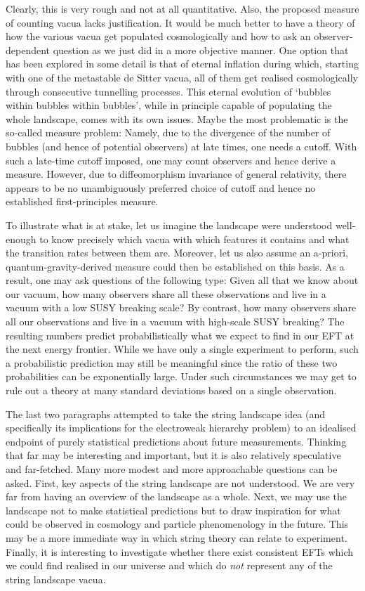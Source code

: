\documentclass[12pt]{article}
\numberwithin{equation}{section}
\begin{document}
Clearly, this is very rough and not at all quantitative. Also, the proposed measure of counting vacua lacks justification. It would be much better to have a theory of how the various vacua get populated cosmologically and how to ask an observer-dependent question as we just did in a more objective manner. One option that has been explored in some detail is that of eternal inflation during which, starting with one of the metastable de Sitter vacua, all of them get realised cosmologically through consecutive tunnelling processes. This eternal evolution of `bubbles within bubbles within bubbles', while in principle capable of populating the whole landscape, comes with its own issues. Maybe the most problematic is the so-called measure problem: Namely, due to the divergence of the number of bubbles (and hence of potential observers) at late times, one needs a cutoff. With such a late-time cutoff imposed, one may count observers and hence derive a measure. However, due to diffeomorphism invariance of general relativity, there appears to be no unambiguously preferred choice of cutoff and hence no established first-principles measure.

To illustrate what is at stake, let us imagine the landscape were understood well-enough to know precisely which vacua with which features it contains and what the transition rates between them are. Moreover, let us also assume an a-priori, quantum-gravity-derived measure could then be established on this basis. As a result, one may ask questions of the following type: Given all that we know about our vacuum, how many observers share all these observations and live in a vacuum with a low SUSY breaking scale? By contrast, how many observers share all our observations and live in a vacuum with high-scale SUSY breaking? The resulting numbers predict probabilistically what we expect to find in our EFT at the next energy frontier. While we have only a single experiment to perform, such a probabilistic prediction may still be meaningful since the ratio of these two probabilities can be exponentially large. Under such circumstances we may get to rule out a theory at many standard deviations based on a single observation.

The last two paragraphs attempted to take the string landscape idea (and specifically its implications for the electroweak hierarchy problem) to an idealised endpoint of purely statistical predictions about future measurements. Thinking that far may be interesting and important, but it is also relatively speculative and far-fetched. Many more modest and more approachable questions can be asked. First, key aspects of the string landscape are not understood. We are very far from having an overview of the landscape as a whole. Next, we may use the landscape not to make statistical predictions but to draw inspiration for what could be observed in cosmology and particle phenomenology in the future. This may be a more immediate way in which string theory can relate to experiment. Finally, it is interesting to investigate whether there exist consistent EFTs which we could find realised in our universe and which do {\it not} represent any of the string landscape vacua.
\end{document}
